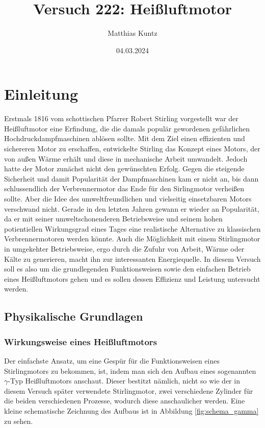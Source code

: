 \documentclass{article}
\title{Versuch 222: Heißluftmotor}
\author{Matthias Kuntz}
\date{04.03.2024}
\begin{document}
\maketitle

\tableofcontents

\newpage

\section{Einleitung}

Erstmals 1816 vom schottischen Pfarrer Robert Stirling vorgestellt war der Heißluftmotor eine Erfindung, die die damals populär gewordenen gefährlichen Hochdruckdampfmaschinen ablösen sollte. Mit dem Ziel einen effizienten und sichereren Motor zu erschaffen, entwickelte Stirling das Konzept eines Motors, der von außen Wärme erhält und diese in mechanische Arbeit umwandelt. Jedoch hatte der Motor zunächst nicht den gewünschten Erfolg. Gegen die steigende Sicherheit und damit Popularität der Dampfmaschinen  kam er nicht an, bis dann schlussendlich der Verbrennermotor das Ende für den Sirlingmotor verheißen sollte. Aber die Idee des umweltfreundlichen und vielseitig einsetzbaren Motors verschwand nicht. Gerade in den letzten Jahren gewann er wieder an Popularität, da er mit seiner umweltschonenderen Betriebsweise und seinem hohen potientiellen Wirkungsgrad eines Tages eine realistische Alternative zu klassischen Verbrennermotoren werden könnte. Auch die Möglichkeit mit einem Stirlingmotor in umgekehter Betriebsweise, ergo durch die Zufuhr von Arbeit, Wärme oder Kälte zu generieren, macht ihn zur interessanten Energiequelle. In diesem Versuch soll es also um die grundlegenden Funktionsweisen sowie den einfachen Betrieb eines Heißluftmotors gehen und es sollen dessen Effizienz und Leistung untersucht werden.

\subsection{Physikalische Grundlagen}

\subsubsection{Wirkungsweise eines Heißluftmotors}

Der einfachste Ansatz, um eine Gespür für die Funktionsweisen eines Stirlingmotors zu bekommen, ist, indem man sich den Aufbau eines sogenannten $\gamma$-Typ Heißluftmotors anschaut. Dieser bestitzt nämlich, nicht so wie der in diesem Versuch später verwendete Stirlingmotor, zwei verschiedene Zylinder für die beiden verschiedenen Prozesse, wodurch diese anschaulicher werden. Eine kleine schematische Zeichnung des Aufbaus ist in Abbildung \ref{fig:schema_gamma} zu sehen. 
\end{document}
